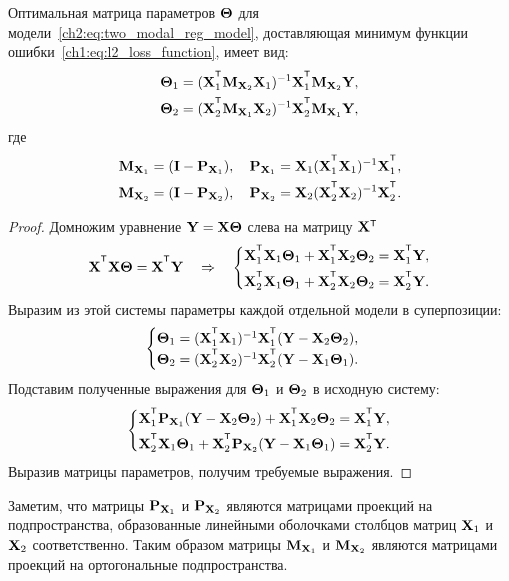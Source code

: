 \begin{statement}
	\label{ch2:stat:two_modal_params}
	Оптимальная матрица параметров $\boldsymbol{\Theta}$ для модели~\eqref{ch2:eq:two_modal_reg_model}, доставляющая минимум функции ошибки~\eqref{ch1:eq:l2_loss_function}, имеет вид:
	\begin{align*}
		\bTheta_1 &= (\bX_1^{\T} \bM_{\bX_2} \bX_1)^{-1} \bX_1^{\T} \bM_{\bX_2} \bY, \\
		\bTheta_2 &= (\bX_2^{\T} \bM_{\bX_1} \bX_2)^{-1} \bX_2^{\T} \bM_{\bX_1} \bY,
	\end{align*}
	где
 	\begin{align*}
		\bM_{\bX_1} = (\bI - \bP_{\bX_1}), \quad \bP_{\bX_1} = \bX_1 (\bX_1^{\T} \bX_1)^{-1} \bX_1^{\T}, \\
		\bM_{\bX_2} = (\bI - \bP_{\bX_2}), \quad \bP_{\bX_2} = \bX_2 (\bX_2^{\T} \bX_2)^{-1} \bX_2^{\T}.
	\end{align*}
\end{statement}
\begin{proof}
	Домножим уравнение $\mathbf{Y} = \mathbf{X} \boldsymbol{\Theta}$ слева на матрицу $\bX{\T}$
	\[
		\bX^{\T} \bX \bTheta = \bX^{\T} \bY \quad \Rightarrow \quad
		\begin{cases*}
			\bX_1^{\T} \bX_1 \bTheta_1 + \bX_1^{\T} \bX_2 \bTheta_2 = \bX_1^{\T} \bY, \\
			\bX_2^{\T} \bX_1 \bTheta_1 + \bX_2^{\T} \bX_2 \bTheta_2 = \bX_2^{\T} \bY.
		\end{cases*}
	\]
	Выразим из этой системы параметры каждой отдельной модели в суперпозиции:
	\[
		\begin{cases}
			\bTheta_1 = (\bX_1^{\T} \bX_1)^{-1} \bX_1^{\T} (\bY - \bX_2 \bTheta_2), \\
			\bTheta_2 = (\bX_2^{\T} \bX_2 )^{-1}  \bX_2^{\T} (\bY - \bX_1 \bTheta_1).
		\end{cases}
	\]
	Подставим полученные выражения для $\boldsymbol{\Theta}_1$ и $\boldsymbol{\Theta}_2$ в исходную систему:
	\[
		\begin{cases*}
			\bX_1^{\T} \bP_{\bX_1} (\bY - \bX_2 \bTheta_2) + \bX_1^{\T} \bX_2 \bTheta_2 = \bX_1^{\T} \bY, \\
			\bX_2^{\T} \bX_1 \bTheta_1 + \bX_2^{\T}\bP_{\bX_2} (\bY - \bX_1 \bTheta_1) = \bX_2^{\T} \bY.
		\end{cases*}
	\]
	Выразив матрицы параметров, получим требуемые выражения.
\end{proof}

Заметим, что матрицы $\mathbf{P}_{\mathbf{X}_1}$ и $\mathbf{P}_{\mathbf{X}_2}$ являются матрицами проекций на подпространства, образованные линейными оболочками столбцов матриц $\mathbf{X}_1$ и $\mathbf{X}_2$ соответственно.
Таким образом матрицы $\mathbf{M}_{\mathbf{X}_1}$ и $\mathbf{M}_{\mathbf{X}_2}$ являются матрицами проекций на ортогональные подпространства.

